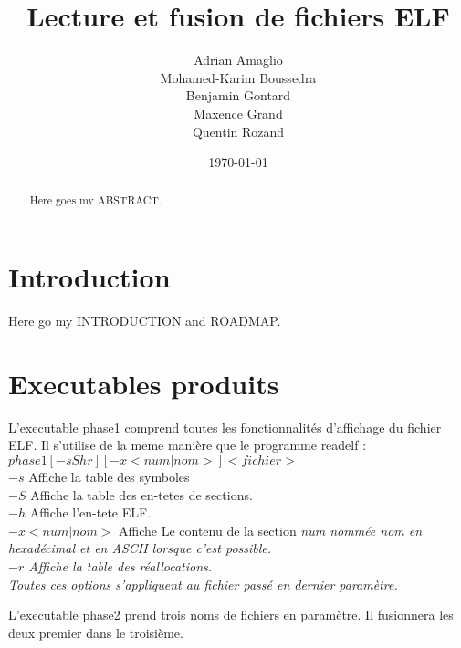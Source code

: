 \documentclass[10pt,twoside]{article}   %
\begin{document}
\title{Lecture et fusion de fichiers ELF}           %
\author{Adrian Amaglio\\Mohamed-Karim Boussedra\\Benjamin Gontard\\Maxence Grand\\Quentin Rozand}
\date{\today}
\maketitle
\tableofcontents

\begin{abstract}
  Here goes my ABSTRACT.
\end{abstract}

\section*{Introduction}\label{sec-intro}
  Here go my INTRODUCTION and ROADMAP.

\section{Executables produits}
	L'executable phase1 comprend toutes les fonctionnalités d'affichage du fichier ELF. Il s'utilise de la meme manière que le programme readelf \cite{readelf}:\\
	$phase1 [-sShr] [-x <num|nom>] <fichier>$\\
	$-s$ Affiche la table des symboles\\
	$-S$ Affiche la table des en-tetes de sections.\\
	$-h$ Affiche l'en-tete ELF.\\
	$-x <num|nom>$ Affiche Le contenu de la section \it{num} nommée \it{nom} en hexadécimal et en ASCII lorsque c'est possible.\\
	$-r$ Affiche la table des réallocations.\\
	Toutes ces options s'appliquent au fichier passé en dernier paramètre.

	L'executable phase2 prend trois noms de fichiers en paramètre. Il fusionnera les deux premier dans le troisième.
\end{document}
